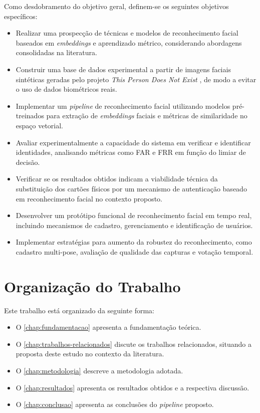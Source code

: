 Como desdobramento do objetivo geral, definem-se os seguintes objetivos específicos:
\begin{itemize}
    \item Realizar uma prospecção de técnicas e modelos de reconhecimento facial baseados em \textit{embeddings} e aprendizado métrico, considerando abordagens consolidadas na literatura.
    \item Construir uma base de dados experimental a partir de imagens faciais sintéticas geradas pelo projeto \textit{This Person Does Not Exist} \cite{thispersondoesnotexist}, de modo a evitar o uso de dados biométricos reais.
    \item Implementar um \textit{pipeline} de reconhecimento facial utilizando modelos pré-treinados para extração de \textit{embeddings} faciais e métricas de similaridade no espaço vetorial.
    \item Avaliar experimentalmente a capacidade do sistema em verificar e identificar identidades, analisando métricas como \acs{FAR} e \acs{FRR} em função do limiar de decisão.
    \item Verificar se os resultados obtidos indicam a viabilidade técnica da substituição dos cartões físicos por um mecanismo de autenticação baseado em reconhecimento facial no contexto proposto.
    \item Desenvolver um protótipo funcional de reconhecimento facial em tempo real, incluindo mecanismos de cadastro, gerenciamento e identificação de usuários.
    \item Implementar estratégias para aumento da robustez do reconhecimento, como cadastro multi-pose, avaliação de qualidade das capturas e votação temporal.
\end{itemize}

\section{Organização do Trabalho}

Este trabalho está organizado da seguinte forma:
\begin{itemize}
    \item O \ref{chap:fundamentacao} apresenta a fundamentação teórica.
    \item O \ref{chap:trabalhos-relacionados} discute os trabalhos relacionados, situando a proposta deste estudo no contexto da literatura.
    \item O \ref{chap:metodologia} descreve a metodologia adotada.
    \item O \ref{chap:resultados} apresenta os resultados obtidos e a respectiva discussão.
    \item O \ref{chap:conclusao} apresenta as conclusões do \textit{pipeline} proposto.
\end{itemize}
